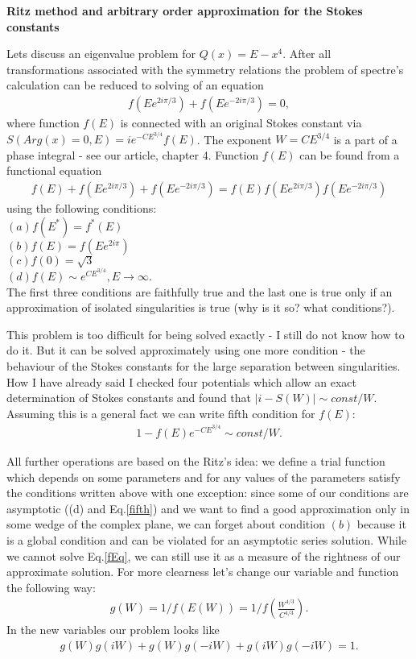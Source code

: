 \documentclass{article}
\begin{document}
\centerline{{\bf Ritz method and arbitrary order approximation for the Stokes constants}}
\vspace{5mm}
Lets discuss an eigenvalue problem for $Q(x)=E-x^4$. After all
transformations associated with the symmetry relations the problem 
of spectre's calculation can be reduced to solving of an equation
\begin{eqnarray}
f(Ee^{2i\pi/3})+f(Ee^{-2i\pi/3})=0,   \label{fSpctr}
\end{eqnarray}
where function $f(E)$ is connected with an original Stokes constant via $S(Arg(x)=0,E)=ie^{-CE^{3/4}}f(E)$. The exponent $W=CE^{3/4}$ is a part of a phase integral - see our article, chapter 4. Function $f(E)$ can be found from a functional equation
\begin{eqnarray}
f(E)+f(Ee^{2i\pi/3})+f(Ee^{-2i\pi/3})=f(E)f(Ee^{2i\pi/3})f(Ee^{-2i\pi/3})   \label{fEq}
\end{eqnarray}
using the following conditions:\\
$(a) f(E^{*}) = f^{*}(E)$\\
$(b) f(E) = f(Ee^{2i\pi})$\\
$(c) f(0) = \sqrt{3}$\\
$(d) f(E) \sim e^{CE^{3/4}}, E \rightarrow \infty$.\\
The first three conditions are faithfully true and the last one is true only if an approximation of isolated singularities is true (why is it so? what conditions?).

This problem is too difficult for being solved exactly - I still do not know how to do it. But it can be solved approximately using one more condition - the behaviour of the Stokes constants for the large separation between singularities. How I have already said I checked four potentials which allow an exact determination of Stokes constants and found that $|i-S(W)| \sim const/W$. Assuming this is a general fact we can write fifth condition for $f(E)$:
\begin{eqnarray}
1-f(E)e^{-CE^{3/4}} \sim const/W. \label{fifth}
\end{eqnarray}

All further operations are based on the Ritz's idea: we define a trial function which depends on some parameters and for any values of the parameters satisfy the conditions written above with one exception: since some of our conditions are asymptotic ((d) and Eq.\ref{fifth}) and we want to find a good approximation only in some wedge of the complex plane, we can forget about condition $(b)$ because it is a global condition and can be violated for an asymptotic series solution. While we cannot solve Eq.\ref{fEq}, we can still use it as a measure of the rightness of our approximate solution. For more clearness let's change our variable and function the following way:
\begin{eqnarray}
g(W)=1/f(E(W))=1/f\left(\frac{W^{4/3}}{C^{4/3}}\right). \label{changes}
\end{eqnarray}
In the new variables our problem looks like
\begin{eqnarray}
g(W)g(iW)+g(W)g(-iW)+g(iW)g(-iW)=1. \label{gEq}
\end{eqnarray}
\end{document}
